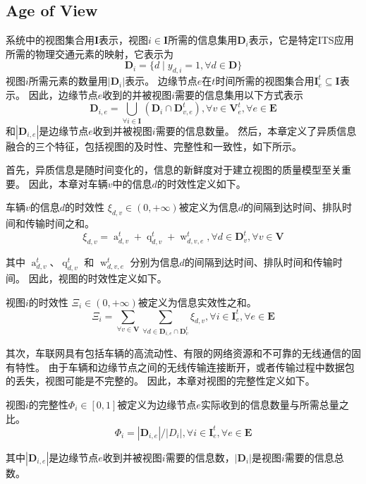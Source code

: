 \subsection{Age of View}
系统中的视图集合用$\mathbf{I}$表示，视图$i \in \mathbf{I}$所需的信息集用$\mathbf{D}_{i}$表示，它是特定ITS应用所需的物理交通元素的映射，它表示为
\begin{equation}
	\mathbf{D}_{i} = \{d \mid y_{d, i} = 1, \forall d \in \mathbf{D} \}
\end{equation}
视图$i$所需元素的数量用$|\mathbf{D}_{i}|$表示。
边缘节点$e$在$t$时间所需的视图集合用$\mathbf{I}_e^t \subseteq \mathbf{I}$表示。
因此，边缘节点$e$收到的并被视图$i$需要的信息集用以下方式表示
\begin{equation}
    \mathbf{D}_{i, e}=\bigcup_{\forall i \in \mathbf{I}}\left(\mathbf{D}_i \cap \mathbf{D}_{v, e}^t\right), \forall v \in \mathbf{V}_e^t, \forall e \in \mathbf{E}
\end{equation}
和$| \mathbf{D}_{i, e} |$是边缘节点$e$收到并被视图$i$需要的信息数量。
然后，本章定义了异质信息融合的三个特征，包括视图的及时性、完整性和一致性，如下所示。

首先，异质信息是随时间变化的，信息的新鲜度对于建立视图的质量模型至关重要。
因此，本章对车辆$v$中的信息$d$的时效性定义如下。
\begin{definition}
	车辆$v$的信息$d$的时效性 $\xi_{d,v} \in (0, +\infty)$被定义为信息$d$的间隔到达时间、排队时间和传输时间之和。
	\begin{equation}
    	\xi_{d, v} = \operatorname{a}_{d, v}^t + \operatorname{q}_{d, v}^t + \operatorname{w}_{d, v, e}^t, \forall d \in \mathbf{D}_v^t, \forall v \in \mathbf{V}
	\end{equation}
\end{definition}
\noindent 其中 $\operatorname{a}_{d, v}^t$、$\operatorname{q}_{d, v}^t$ 和 $\operatorname{w}_{d, v, e}^t$ 分别为信息$d$的间隔到达时间、排队时间和传输时间。
因此，视图的时效性定义如下。
\begin{definition}
视图$i$的时效性 $\Xi_{i} \in (0,+\infty)$被定义为信息实效性之和。
	\begin{equation}
    	\Xi_{i} = \sum_{\forall v \in \mathbf{V}} \sum_{\forall d \in \mathbf{D}_{i, e} \cap \mathbf{D}_v^t } \xi_{d, v}, \forall i \in \mathbf{I}_e^t, \forall e \in \mathbf{E}
	\end{equation}
\end{definition}

其次，车联网具有包括车辆的高流动性、有限的网络资源和不可靠的无线通信的固有特性。
由于车辆和边缘节点之间的无线传输连接断开，或者传输过程中数据包的丢失，视图可能是不完整的。
因此，本章对视图的完整性定义如下。
\begin{definition}
	视图$i$的完整性$\Phi_{i} \in [0,1]$被定义为边缘节点$e$实际收到的信息数量与所需总量之比。
	\begin{equation}
	\Phi_{i}= {| \mathbf{D}_{i, e} |} \big/ {|D_{i} |}, \forall i \in \mathbf{I}_e^t, \forall e \in \mathbf{E}
	\end{equation}
\end{definition}
\noindent 其中$|\mathbf{D}_{i, e}|$是边缘节点$e$收到并被视图$i$需要的信息数，$|\mathbf{D}_{i}|$是视图$i$需要的信息总数。

